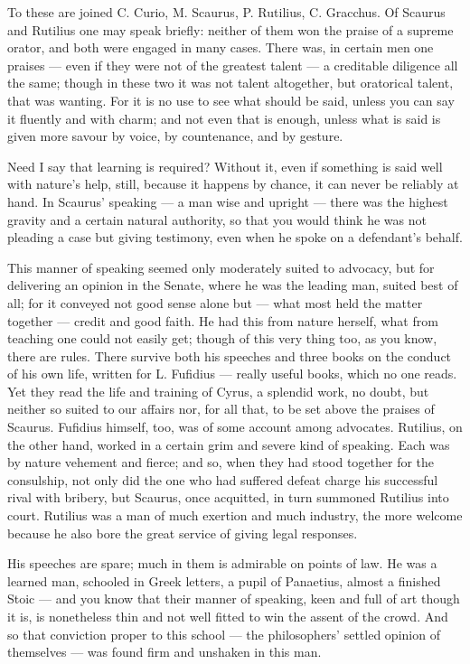  To these are joined C. Curio, M. Scaurus, P. Rutilius, C. Gracchus. Of Scaurus and Rutilius one may speak briefly: neither of them won the praise of a supreme orator, and both were engaged in many cases. There was, in certain men one praises — even if they were not of the greatest talent — a creditable diligence all the same; though in these two it was not talent altogether, but oratorical talent, that was wanting. For it is no use to see what should be said, unless you can say it fluently and with charm; and not even that is enough, unless what is said is given more savour by voice, by countenance, and by gesture.

 Need I say that learning is required? Without it, even if something is said well with nature's help, still, because it happens by chance, it can never be reliably at hand. In Scaurus' speaking — a man wise and upright — there was the highest gravity and a certain natural authority, so that you would think he was not pleading a case but giving testimony, even when he spoke on a defendant's behalf.

 This manner of speaking seemed only moderately suited to advocacy, but for delivering an opinion in the Senate, where he was the leading man, suited best of all; for it conveyed not good sense alone but — what most held the matter together — credit and good faith. He had this from nature herself, what from teaching one could not easily get; though of this very thing too, as you know, there are rules. There survive both his speeches and three books on the conduct of his own life, written for L. Fufidius — really useful books, which no one reads. Yet they read the life and training of Cyrus, a splendid work, no doubt, but neither so suited to our affairs nor, for all that, to be set above the praises of Scaurus. Fufidius himself, too, was of some account among advocates. Rutilius, on the other hand, worked in a certain grim and severe kind of speaking. Each was by nature vehement and fierce; and so, when they had stood together for the consulship, not only did the one who had suffered defeat charge his successful rival with bribery, but Scaurus, once acquitted, in turn summoned Rutilius into court. Rutilius was a man of much exertion and much industry, the more welcome because he also bore the great service of giving legal responses.

 His speeches are spare; much in them is admirable on points of law. He was a learned man, schooled in Greek letters, a pupil of Panaetius, almost a finished Stoic — and you know that their manner of speaking, keen and full of art though it is, is nonetheless thin and not well fitted to win the assent of the crowd. And so that conviction proper to this school — the philosophers' settled opinion of themselves — was found firm and unshaken in this man.

